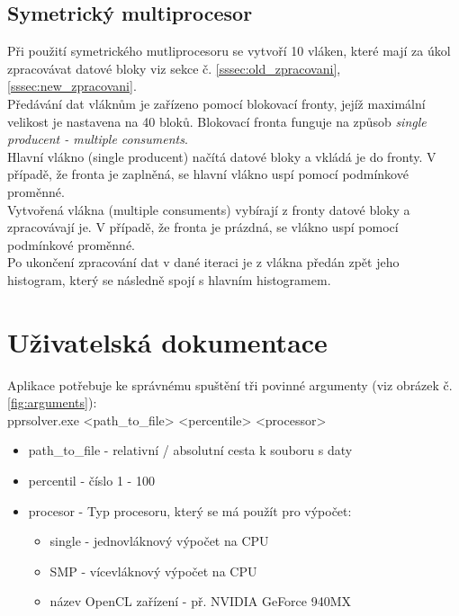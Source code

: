 \documentclass[12pt, a4paper]{article}
\begin{document}
\subsection{Symetrický multiprocesor}
Při použití symetrického mutliprocesoru se vytvoří 10 vláken, které mají za úkol zpracovávat datové bloky viz sekce č. \ref{sssec:old_zpracovani}, \ref{sssec:new_zpracovani}.\\
\indent Předávání dat vláknům je zařízeno pomocí blokovací fronty, jejíž maximální velikost je nastavena na 40 bloků. Blokovací fronta funguje na způsob \textit{single producent - multiple consuments}. \\
\indent Hlavní vlákno (single producent) načítá datové bloky a vkládá je do fronty. V případě, že fronta je zaplněná, se hlavní vlákno uspí pomocí podmínkové proměnné. \\
\indent Vytvořená vlákna (multiple consuments) vybírají z fronty datové bloky a zpracovávají je. V případě, že fronta je prázdná, se vlákno uspí pomocí podmínkové proměnné. \\
\indent Po ukončení zpracování dat v dané iteraci je z vlákna předán zpět jeho histogram, který se následně spojí s hlavním histogramem.










\section{Uživatelská dokumentace}
\noindent Aplikace potřebuje ke správnému spuštění tři povinné argumenty (viz obrázek č.\ref{fig:arguments}):\\

\noindent pprsolver.exe <path\_to\_file> <percentile> <processor>

\begin{itemize}
\item path\_to\_file - relativní / absolutní cesta k souboru s daty
\item percentil - číslo 1 - 100
\item procesor - Typ procesoru, který se má použít pro výpočet:
\begin{itemize}
\item single - jednovláknový výpočet na CPU
\item SMP - vícevláknový výpočet na CPU
\item název OpenCL zařízení - př. NVIDIA GeForce 940MX
\end{itemize}
\end{itemize}
\end{document}

